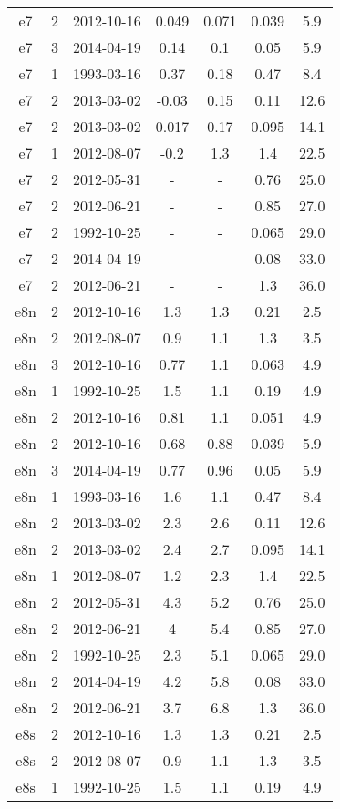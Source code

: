 \begin{table*}[htp]
\begin{tabular}{ccccccc}
e7 & 2 & 2012-10-16 & 0.049 & 0.071 & 0.039 & 5.9 \\
e7 & 3 & 2014-04-19 & 0.14 & 0.1 & 0.05 & 5.9 \\
e7 & 1 & 1993-03-16 & 0.37 & 0.18 & 0.47 & 8.4 \\
e7 & 2 & 2013-03-02 & -0.03 & 0.15 & 0.11 & 12.6 \\
e7 & 2 & 2013-03-02 & 0.017 & 0.17 & 0.095 & 14.1 \\
e7 & 1 & 2012-08-07 & -0.2 & 1.3 & 1.4 & 22.5 \\
e7 & 2 & 2012-05-31 & - & - & 0.76 & 25.0 \\
e7 & 2 & 2012-06-21 & - & - & 0.85 & 27.0 \\
e7 & 2 & 1992-10-25 & - & - & 0.065 & 29.0 \\
e7 & 2 & 2014-04-19 & - & - & 0.08 & 33.0 \\
e7 & 2 & 2012-06-21 & - & - & 1.3 & 36.0 \\
e8n & 2 & 2012-10-16 & 1.3 & 1.3 & 0.21 & 2.5 \\
e8n & 2 & 2012-08-07 & 0.9 & 1.1 & 1.3 & 3.5 \\
e8n & 3 & 2012-10-16 & 0.77 & 1.1 & 0.063 & 4.9 \\
e8n & 1 & 1992-10-25 & 1.5 & 1.1 & 0.19 & 4.9 \\
e8n & 2 & 2012-10-16 & 0.81 & 1.1 & 0.051 & 4.9 \\
e8n & 2 & 2012-10-16 & 0.68 & 0.88 & 0.039 & 5.9 \\
e8n & 3 & 2014-04-19 & 0.77 & 0.96 & 0.05 & 5.9 \\
e8n & 1 & 1993-03-16 & 1.6 & 1.1 & 0.47 & 8.4 \\
e8n & 2 & 2013-03-02 & 2.3 & 2.6 & 0.11 & 12.6 \\
e8n & 2 & 2013-03-02 & 2.4 & 2.7 & 0.095 & 14.1 \\
e8n & 1 & 2012-08-07 & 1.2 & 2.3 & 1.4 & 22.5 \\
e8n & 2 & 2012-05-31 & 4.3 & 5.2 & 0.76 & 25.0 \\
e8n & 2 & 2012-06-21 & 4 & 5.4 & 0.85 & 27.0 \\
e8n & 2 & 1992-10-25 & 2.3 & 5.1 & 0.065 & 29.0 \\
e8n & 2 & 2014-04-19 & 4.2 & 5.8 & 0.08 & 33.0 \\
e8n & 2 & 2012-06-21 & 3.7 & 6.8 & 1.3 & 36.0 \\
e8s & 2 & 2012-10-16 & 1.3 & 1.3 & 0.21 & 2.5 \\
e8s & 2 & 2012-08-07 & 0.9 & 1.1 & 1.3 & 3.5 \\
e8s & 1 & 1992-10-25 & 1.5 & 1.1 & 0.19 & 4.9 \\

\end{tabular}
\end{table*}
